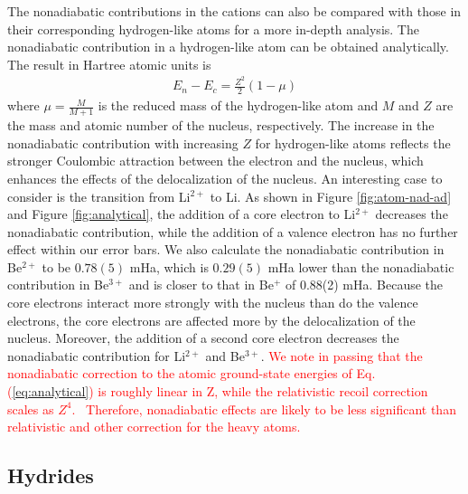 \documentclass[aip,jcp,numerical,reprint]{revtex4-1}
\begin{document}
The nonadiabatic contributions in the cations can also be compared with those in their corresponding hydrogen-like atoms for a more in-depth analysis. The nonadiabatic contribution in a hydrogen-like atom can be obtained analytically. The result in Hartree atomic units is
\begin{align}
E_n-E_c=\frac{Z^2}{2}(1-\mu) \label{eq:analytical}
\end{align}
where $\mu=\frac{M}{M+1}$ is the reduced mass of the hydrogen-like atom and $M$ and $Z$ are the mass and atomic number of the nucleus, respectively. The increase in the nonadiabatic contribution with increasing $Z$ for hydrogen-like atoms reflects the stronger Coulombic attraction between the electron and the nucleus, which enhances the effects of the delocalization of the nucleus. An interesting case to consider is the transition from Li$^{2+}$ to Li. As shown in Figure \ref{fig:atom-nad-ad} and Figure \ref{fig:analytical}, the addition of a core electron to Li$^{2+}$ decreases the nonadiabatic contribution, while the addition of a valence electron has no further effect within our error bars. We also calculate the nonadiabatic contribution in Be$^{2+}$ to be $0.78(5)$ mHa, which is $0.29(5)$ mHa lower than the nonadiabatic contribution in Be$^{3+}$ and is closer to that in Be$^{+}$ of 0.88(2) mHa. Because the core electrons interact more strongly with the nucleus than do the valence electrons, the core electrons are affected more by the delocalization of the nucleus. Moreover, the addition of a second core electron decreases the nonadiabatic contribution for Li$^{2+}$ and Be$^{3+}$. %
\textcolor{red}{We note in passing that the nonadiabatic correction to the atomic ground-state energies of Eq. (\ref{eq:analytical}) is roughly linear in Z, while the relativistic recoil correction scales as $Z^4$.~\cite{Merkt_H2} Therefore, nonadiabatic effects are likely to be less significant than relativistic and other correction for the heavy atoms.}

\subsection{Hydrides}
\end{document}
